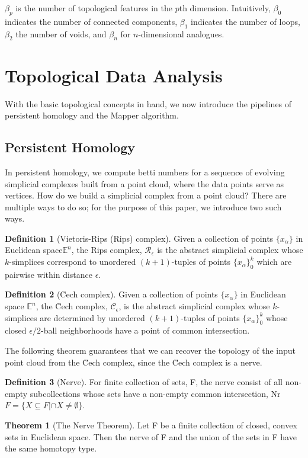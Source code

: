 \documentclass[12pt]{article}
\theoremstyle{definition}
\newtheorem{definition}{Definition}
\newtheorem{theorem}{Theorem}
\begin{document}
$\beta_p$ is the number of topological features in the $p$th dimension. Intuitively, $\beta_0$ indicates the number of connected components, $\beta_1$ indicates the number of loops, $\beta_2$ the number of voids, and $\beta_n$ for $n$-dimensional analogues\cite{zhu2013language}. 

\section{Topological Data Analysis}

With the basic topological concepts in hand, we now introduce the pipelines of persistent homology and the Mapper algorithm.

\subsection{Persistent Homology}

In persistent homology, we compute betti numbers for a sequence of evolving simplicial complexes built from a point cloud, where the data points serve as vertices. How do we build a simplicial complex from a point cloud? There are multiple ways to do so; for the purpose of this paper, we introduce two such ways.
\begin{definition}[Vietoris-Rips (Rips) complex]
Given a collection of points $\{x_\alpha\}$ in Euclidean space$\mathbb{E}^n$, the Rips complex, $\mathcal{R}_\epsilon$ is the abstract simplicial complex whose $k$-simplices correspond to unordered $(k + 1)$-tuples of points $\{x_\alpha\}_0^k$ which are pairwise within distance $\epsilon$.\cite{ghrist2007barcodes}
\end{definition}
\begin{definition}[\u Cech complex]
Given a collection of points $\{x_\alpha\}$ in Euclidean space $\mathbb{E}^n$, the \u Cech complex, $\mathcal{C}_\epsilon$, is the abstract simplicial complex whose $k$-simplices are determined by unordered $(k + 1)$-tuples of points $\{x_\alpha\}_0^k$ whose closed $\epsilon/2$-ball neighborhoods have a point of common intersection.\cite{ghrist2007barcodes}
\end{definition}
The following theorem guarantees that we can recover the topology of the input point cloud from the \u Cech complex, since the \u Cech complex is a nerve.
\begin{definition}[Nerve]
For finite collection of sets, F, the nerve consist of all non-empty subcollections whose sets have a non-empty common intersection, Nr$F=\{X\subseteq F | \cap X \neq \emptyset\}$.\cite{edelsbrunner2010computational}
\end{definition}
\begin{theorem}[The Nerve Theorem]
Let F be a finite collection of closed, convex sets in Euclidean space. Then the nerve of F and the union of the sets in F have the same homotopy type.\cite{edelsbrunner2010computational}
\end{theorem}
\end{document}
